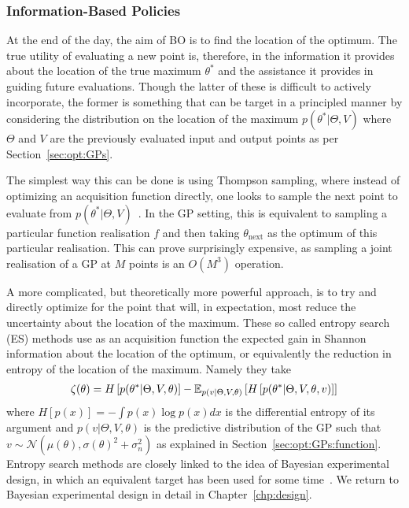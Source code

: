 \subsubsection{Information-Based Policies}
\label{sec:opt:BO:acq:inf}

At the end of the day, the aim of BO is to find the location of the optimum.  The true utility of
evaluating a new point is, therefore, in the information it provides about the location of the
true maximum $\theta^*$ and the assistance it provides in guiding future evaluations.  Though 
the latter of these is difficult to actively incorporate, the former is something that can be
target in a principled manner by considering the distribution on the location of the maximum
$p(\theta^* | \Theta, V)$ where $\Theta$ and $V$ are the previously evaluated input and output
points as per Section~\ref{sec:opt:GPs}.

The simplest way this can be done is using Thompson sampling\citep{thompson1933likelihood}, 
where instead of optimizing an acquisition function directly, one looks to sample the next
point to evaluate from $p(\theta^* | \Theta, V)$~\citep{shahriari2014entropy,bijl2016sequential,kandasamy2017asynchronous}.  
In the GP setting, this is equivalent to sampling a particular function realisation $f$ and then taking 
$\theta_{\text{next}}$
as the optimum of this particular realisation.  This can prove surprisingly expensive, as sampling
a joint realisation of a GP at $M$ points is an $O(M^3)$ operation.  

A more complicated, but theoretically more powerful approach, is to try and directly optimize
for the point that will, in expectation, most reduce the uncertainty about the location of the maximum.
These so called entropy search (ES) methods 
\citep{villemonteix2009informational,hennig2012entropy,hernandez2014predictive} use as an
acquisition function the expected gain in Shannon information about the location of the optimum,
or equivalently the reduction in entropy of the location of the maximum. Namely they take
\begin{align}
\label{eq:opt:ent-search}
\zeta (\theta) = H\left[p(\theta^* | \Theta, V, \theta)\right]-
\mathbb{E}_{p(v| \Theta,V, \theta)} \left[H\left[p(\theta^* | \Theta, V, \theta, v)\right]\right]
\end{align}
where $H[p(x)]=-\int p(x)\log p(x)dx$ is the differential entropy of its argument
and $p(v| \Theta,V, \theta)$ is the predictive distribution of the GP such that
$v\sim\mathcal{N}\left(\mu(\theta),\sigma(\theta)^2+\sigma_n^2\right)$ as
explained in Section~\ref{sec:opt:GPs:function}.
Entropy search methods are closely linked to the idea of Bayesian experimental design, in which an equivalent
target has been used for some time~\cite{chaloner1995bayesian}.  We return to Bayesian experimental
design in detail in Chapter~\ref{chp:design}.

